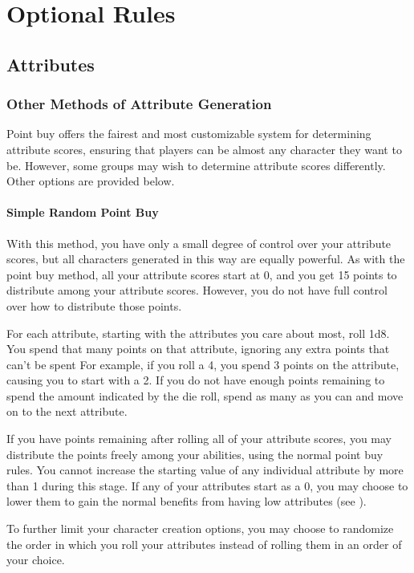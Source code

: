 \chapter{Optional Rules}

\section{Attributes}

  \subsection{Other Methods of Attribute Generation}
    Point buy offers the fairest and most customizable system for determining attribute scores, ensuring that players can be almost any character they want to be. However, some groups may wish to determine attribute scores differently. Other options are provided below.

    \subsubsection{Simple Random Point Buy}
      With this method, you have only a small degree of control over your attribute scores, but all characters generated in this way are equally powerful.
      As with the point buy method, all your attribute scores start at 0, and you get 15 points to distribute among your attribute scores.
      However, you do not have full control over how to distribute those points.

      For each attribute, starting with the attributes you care about most, roll 1d8.
      You spend that many points on that attribute, ignoring any extra points that can't be spent
      For example, if you roll a 4, you spend 3 points on the attribute, causing you to start with a 2.
      If you do not have enough points remaining to spend the amount indicated by the die roll, spend as many as you can and move on to the next attribute.

      If you have points remaining after rolling all of your attribute scores, you may distribute the points freely among your abilities, using the normal point buy rules.
      You cannot increase the starting value of any individual attribute by more than 1 during this stage.
      If any of your attributes start as a 0, you may choose to lower them to gain the normal benefits from having low attributes (see ).

      To further limit your character creation options, you may choose to randomize the order in which you roll your attributes instead of rolling them in an order of your choice.


